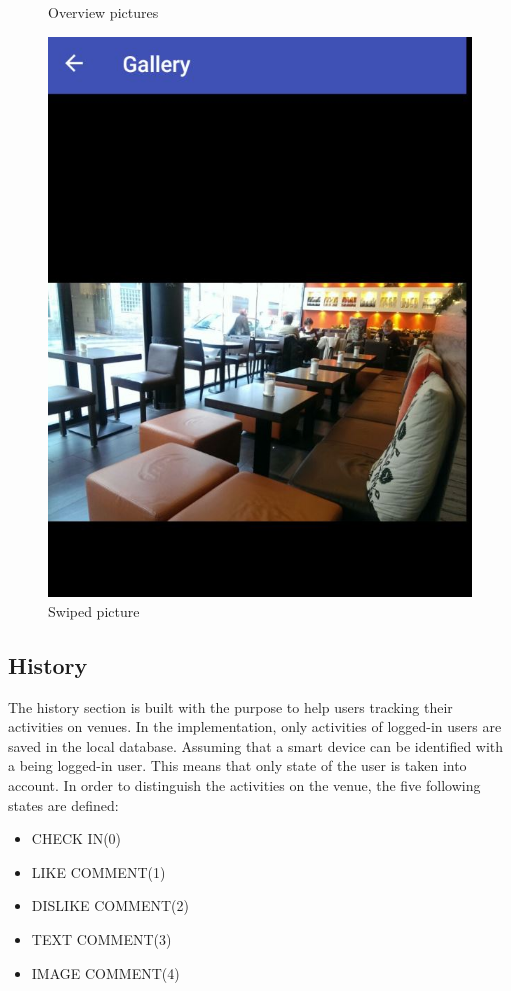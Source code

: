 \begin{figure}[!htb]
    \caption{Overview pictures}\label{fig:overimages}
	\includegraphics[width=\linewidth]{images/swipeimage.jpg}
	\caption{Swiped picture}\label{fig:swipeimage}
	\endminipage\hfill

\end{figure}

\subsection{History}
The history section is built with the purpose to help users tracking their activities on venues. In the implementation,  only activities of logged-in users are saved in the local database. Assuming that a smart device can be identified with a being logged-in user. This means that only state of the user is taken into account. In order to distinguish the activities on the venue, the five following states are defined:

\begin{itemize}
	\item CHECK IN(0)
	\item LIKE COMMENT(1)
	\item DISLIKE COMMENT(2)
	\item TEXT COMMENT(3)
	\item IMAGE COMMENT(4)
\end{itemize}

